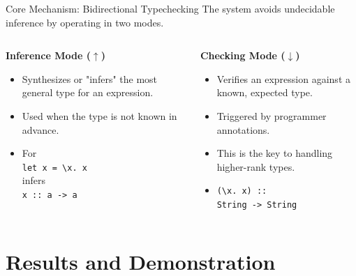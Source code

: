\documentclass[serif, aspectratio=169]{beamer}
\begin{document}
\begin{frame}{Core Mechanism: Bidirectional Typechecking}
  The system avoids undecidable inference by operating in two modes.

  \begin{columns}[T]
    \begin{column}{0.5\textwidth}
      \textbf{Inference Mode ($\uparrow$)}
      \begin{itemize}
        \item Synthesizes or "infers" the most general type for an expression.
        \item Used when the type is not known in advance.
        \item For \\ \quad \texttt{let x = \textbackslash x. x} \\ infers \\ \quad \texttt{x :: a -> a}
      \end{itemize}
    \end{column}
    \begin{column}{0.5\textwidth}
      \textbf{Checking Mode ($\downarrow$)}
      \begin{itemize}
        \item Verifies an expression against a known, expected type.
        \item Triggered by programmer annotations.
        \item This is the key to handling higher-rank types.
        \item \texttt{(\textbackslash x. x) :: \\ \quad \quad String -> String}
      \end{itemize}
    \end{column}
  \end{columns}
\end{frame}

\section{Results and Demonstration}
\end{document}
